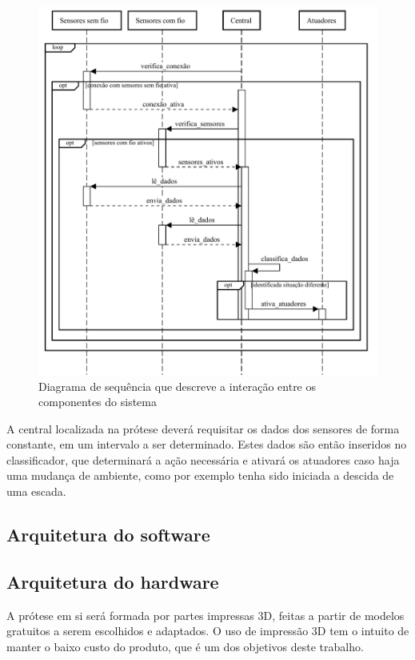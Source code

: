 \begin{figure}[ht]
	\caption{\label{fig:sequence_diagram}Diagrama de sequência que descreve a interação entre os componentes do sistema}
	\begin{center}
	    \includegraphics[width=\textwidth]{resources/sequence_diagram.pdf}
	\end{center}
\end{figure}

A central localizada na prótese deverá requisitar os dados dos sensores de forma constante, em um intervalo a ser determinado. Estes dados são então inseridos no classificador, que determinará a ação necessária e ativará os atuadores caso haja uma mudança de ambiente, como por exemplo tenha sido iniciada a descida de uma escada.

\subsection{Arquitetura do software}\label{sec:metodo_prot_software}

\subsection{Arquitetura do hardware}\label{sec:metodo_prot_hardware}
A prótese em si será formada por partes impressas 3D, feitas a partir de modelos gratuitos a serem escolhidos e adaptados. O uso de impressão 3D tem o intuito de manter o baixo custo do produto, que é um dos objetivos deste trabalho.

